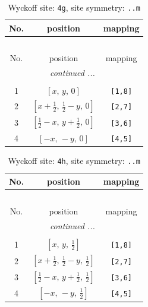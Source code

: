 \documentclass[fleqn,8pt]{jsarticle}
\begin{document}
\renewcommand{\arraystretch}{1.2}
\begin{longtable}{ccc}
\caption{Wyckoff site: {\tt 4g}, site symmetry: {\tt ..m}}
 \\
 \hline \hline
No. & position & mapping \\ \hline \endfirsthead

\multicolumn{2}{l}{\tablename\ \thetable{}} \\
 \hline \hline
No. & position & mapping \\ \hline \endhead

 \hline \hline
\multicolumn{2}{r}{\footnotesize\it continued ...} \\ \endfoot

 \hline \hline
\multicolumn{2}{r}{} \\ \endlastfoot

1 & $\left[ x,\, y,\, 0 \right]$ & {\tt [1,8]} \\ \hline
2 & $\left[ x + \frac{1}{2},\, \frac{1}{2} - y,\, 0 \right]$ & {\tt [2,7]} \\ \hline
3 & $\left[ \frac{1}{2} - x,\, y + \frac{1}{2},\, 0 \right]$ & {\tt [3,6]} \\ \hline
4 & $\left[ - x,\, - y,\, 0 \right]$ & {\tt [4,5]} \\
\end{longtable}
\renewcommand{\arraystretch}{1.2}
\begin{longtable}{ccc}
\caption{Wyckoff site: {\tt 4h}, site symmetry: {\tt ..m}}
 \\
 \hline \hline
No. & position & mapping \\ \hline \endfirsthead

\multicolumn{2}{l}{\tablename\ \thetable{}} \\
 \hline \hline
No. & position & mapping \\ \hline \endhead

 \hline \hline
\multicolumn{2}{r}{\footnotesize\it continued ...} \\ \endfoot

 \hline \hline
\multicolumn{2}{r}{} \\ \endlastfoot

1 & $\left[ x,\, y,\, \frac{1}{2} \right]$ & {\tt [1,8]} \\ \hline
2 & $\left[ x + \frac{1}{2},\, \frac{1}{2} - y,\, \frac{1}{2} \right]$ & {\tt [2,7]} \\ \hline
3 & $\left[ \frac{1}{2} - x,\, y + \frac{1}{2},\, \frac{1}{2} \right]$ & {\tt [3,6]} \\ \hline
4 & $\left[ - x,\, - y,\, \frac{1}{2} \right]$ & {\tt [4,5]} \\
\end{longtable}
\end{document}
